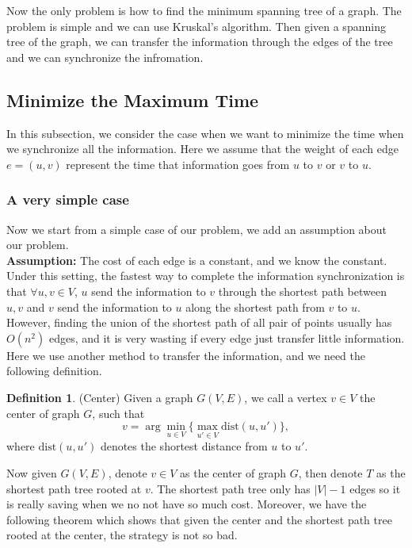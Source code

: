 \documentclass{article}
\theoremstyle{plain}
\theoremstyle{definition}
\newtheorem{defn}{Definition}[section]
\theoremstyle{remark}
\begin{document}
    Now the only problem is how to find the minimum spanning tree of a graph. The problem is simple and we can use Kruskal's algorithm. Then given a spanning tree of the graph, we can transfer the information through the edges of the tree and we can synchronize the infromation.

    \subsection{Minimize the Maximum Time}
    In this subsection, we consider the case when we want to minimize the time when we synchronize all the information. Here we assume that the weight of each edge $e = (u,v)$ represent the time that information goes from $u$ to $v$ or $v$ to $u$.

    \subsubsection{A very simple case}
    Now we start from a simple case of our problem, we add an assumption about our problem.\\
    
    \textbf{Assumption:} The cost of each edge is a constant, and we know the constant.\\
    
    Under this setting, the fastest way to complete the information synchronization is that $\forall u,v\in V$, $u$ send the information to $v$ through the shortest path between $u,v$ and $v$ send the information to $u$ along the shortest path from $v$ to $u$. However, finding the union of the shortest path of all pair of points usually has $O(n^2)$ edges, and it is very wasting if every edge just transfer little information.\\

    Here we use another method to transfer the information, and we need the following definition.

    \begin{defn}\label{center}
        (Center) Given a graph $G(V,E)$, we call a vertex $v\in V$ the center of graph $G$, such that
        \[v = \arg\min_{u\in V}\{\max_{u'\in V}\text{dist}(u,u')\},\]
        where $\text{dist}(u,u')$ denotes the shortest distance from $u$ to $u'$.
    \end{defn}

    Now given $G(V,E)$, denote $v\in V$ as the center of graph $G$, then denote $T$ as the shortest path tree rooted at $v$. The shortest path tree only has $|V|-1$ edges so it is really saving when we no not have so much cost. Moreover, we have the following theorem which shows that given the center and the shortest path tree rooted at the center, the strategy is not so bad.
\end{document}
